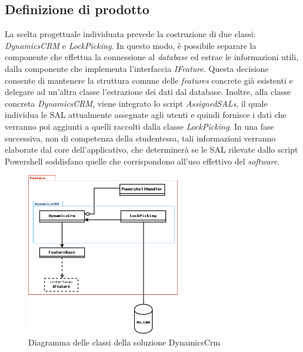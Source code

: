 \subsection{Definizione di prodotto}
La scelta progettuale individuata prevede la costruzione di due classi: \emph{DynamicsCRM} e \emph{LockPicking}.
In questo modo, è possibile separare la componente che effettua la connessione al \emph{database} ed estrae le informazioni utili, dalla componente che implementa l'interfaccia \emph{IFeature}.
Questa decisione consente di mantenere la struttura comune delle \emph{features} concrete già esistenti e delegare ad un'altra classe l'estrazione dei dati dal database.
Inoltre, alla classe concreta \emph{DynamicsCRM}, viene integrato lo script \emph{AssignedSALs}, il quale individua le SAL attualmente assegnate agli utenti e quindi fornisce i dati che verranno poi aggiunti a quelli raccolti dalla classe \emph{LockPicking}. In una fase successiva, non di competenza della studentessa, tali informazioni verranno elaborate dal core dell'applicativo, che determinerà se le SAL rilevate dallo script Powershell soddisfano quelle che corrispondono all'uso effettivo del \emph{software}.
\clearpage
\begin{figure}[H]
\centering
\captionsetup{justification=centering,margin=2cm}
\includegraphics[width=0.6\textwidth ]{figures/CRMclassdia.png}
\caption [Diagramma delle classi della soluzione DynamicsCrm]{Diagramma delle classi della soluzione DynamicsCrm \label{fig:CRMclassDia}}
\end{figure}

